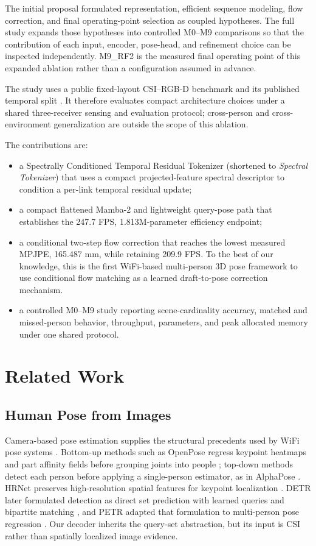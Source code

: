 \documentclass[conference,onecolumn]{IEEEtran}
\begin{document}
The initial proposal formulated representation, efficient sequence modeling, flow correction, and final operating-point selection as coupled hypotheses. The full study expands those hypotheses into controlled M0--M9 comparisons so that the contribution of each input, encoder, pose-head, and refinement choice can be inspected independently. M9\_RF2 is the measured final operating point of this expanded ablation rather than a configuration assumed in advance.

The study uses a public fixed-layout CSI--RGB-D benchmark and its published temporal split \cite{yan2024personwifi3d}. It therefore evaluates compact architecture choices under a shared three-receiver sensing and evaluation protocol; cross-person and cross-environment generalization are outside the scope of this ablation.

The contributions are:
\begin{itemize}
    \item a Spectrally Conditioned Temporal Residual Tokenizer (shortened to \emph{Spectral Tokenizer}) that uses a compact projected-feature spectral descriptor to condition a per-link temporal residual update;
    \item a compact flattened Mamba-2 and lightweight query-pose path that establishes the 247.7 FPS, 1.813M-parameter efficiency endpoint;
    \item a conditional two-step flow correction that reaches the lowest measured MPJPE, 165.487 mm, while retaining 209.9 FPS. To the best of our knowledge, this is the first WiFi-based multi-person 3D pose framework to use conditional flow matching as a learned draft-to-pose correction mechanism.
    \item a controlled M0--M9 study reporting scene-cardinality accuracy, matched and missed-person behavior, throughput, parameters, and peak allocated memory under one shared protocol.
\end{itemize}

\section{Related Work}
\subsection{Human Pose from Images}
\label{sec:related-camera}
Camera-based pose estimation supplies the structural precedents used by WiFi pose systems \cite{zheng2023posesurvey}. Bottom-up methods such as OpenPose regress keypoint heatmaps and part affinity fields before grouping joints into people \cite{cao2017openpose}; top-down methods detect each person before applying a single-person estimator, as in AlphaPose \cite{fang2017alphapose}. HRNet preserves high-resolution spatial features for keypoint localization \cite{sun2019hrnet}. DETR later formulated detection as direct set prediction with learned queries and bipartite matching \cite{carion2020detr}, and PETR adapted that formulation to multi-person pose regression \cite{shi2022petr}. Our decoder inherits the query-set abstraction, but its input is CSI rather than spatially localized image evidence.
\end{document}
